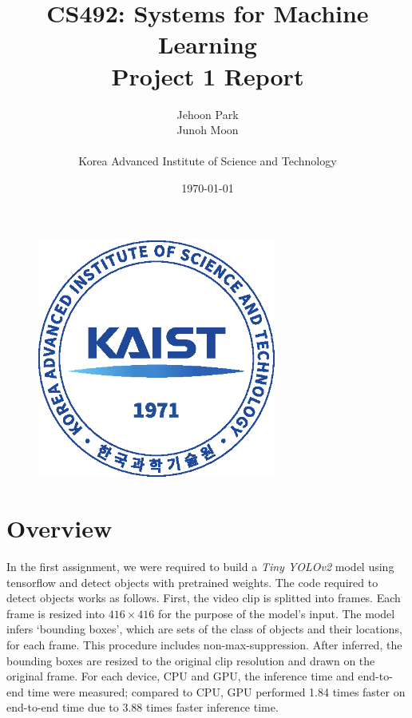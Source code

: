 \documentclass[a4paper,12pt]{article}
\begin{document}
 
\title{CS492: Systems for Machine Learning\\\large Project 1 Report}
\author{Jehoon Park\\Junoh Moon\\\\Korea Advanced Institute of Science and Technology}
\date{\today}

\begin{figure}[!b]
	\centering
	\includegraphics[width=0.7\textwidth]{./kaist_emblem2.eps}
	\label{figure:school_logo}
\end{figure}

\maketitle
\thispagestyle{empty} %
\newpage

\section{Overview}
In the first assignment, we were required to build a \emph{Tiny YOLOv2} model using tensorflow and detect objects with pretrained weights. The code required to detect objects works as follows. First, the video clip is splitted into frames. Each frame is resized into $416 \times 416$ for the purpose of the model's input. The model infers `bounding boxes', which are sets of the class of objects and their locations, for each frame. This procedure includes non-max-suppression. After inferred, the bounding boxes are resized to the original clip resolution and drawn on the original frame.
For each device, CPU and GPU, the inference time and end-to-end time were measured; compared to CPU, GPU performed 1.84 times faster on end-to-end time due to 3.88 times faster inference time.
\end{document}

